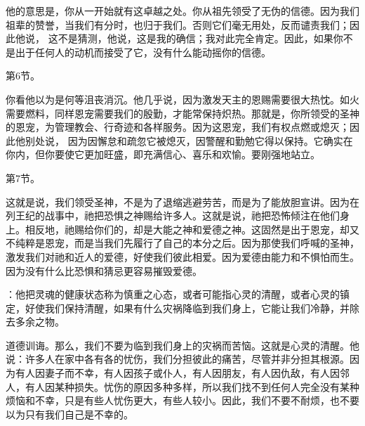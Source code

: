 他的意思是，你从一开始就有这卓越之处。你从祖先领受了无伪的信德。因为我们祖辈的赞誉，当我们有分时，也归于我们。否则它们毫无用处，反而谴责我们；因此他说， 这不是猜测，他说，这是我的确信；我对此完全肯定。因此，如果你不是出于任何人的动机而接受了它，没有什么能动摇你的信德。\par

第6节。 \par

你看他以为是何等沮丧消沉。他几乎说，因为激发天主的恩赐需要很大热忱。如火需要燃料，同样恩宠需要我们的殷勤，才能常保持炽热。那就是，你所领受的圣神的恩宠，为管理教会、行奇迹和各样服务。因为这恩宠，我们有权点燃或熄灭；因此他别处说， 因为因懈怠和疏忽它被熄灭，因警醒和勤勉它得以保持。它确实在你内，但你要使它更加旺盛，即充满信心、喜乐和欢愉。要刚强地站立。\par

第7节。 \par

这就是说，我们领受圣神，不是为了退缩逃避劳苦，而是为了能放胆宣讲。因为在列王纪的战事中，祂把恐惧之神赐给许多人。这就是说，祂把恐怖倾注在他们身上。相反地，祂赐给你们的，却是大能之神和爱德之神。这固然是出于恩宠，却又不纯粹是恩宠，而是当我们先履行了自己的本分之后。因为那使我们呼喊的圣神，激发我们对祂和近人的爱德，好使我们彼此相爱。因为爱德由能力和不惧怕而生。因为没有什么比恐惧和猜忌更容易摧毁爱德。\par

：他把灵魂的健康状态称为慎重之心态，或者可能指心灵的清醒，或者心灵的镇定，好使我们保持清醒，如果有什么灾祸降临到我们身上，它能让我们冷静，并除去多余之物。\par

道德训诲。那么，我们不要为临到我们身上的灾祸而苦恼。这就是心灵的清醒。他说：许多人在家中各有各的忧伤，我们分担彼此的痛苦，尽管并非分担其根源。因为有人因妻子而不幸，有人因孩子或仆人，有人因朋友，有人因仇敌，有人因邻人，有人因某种损失。忧伤的原因多种多样，所以我们找不到任何人完全没有某种烦恼和不幸，只是有些人忧伤更大，有些人较小。因此，我们不要不耐烦，也不要以为只有我们自己是不幸的。\par

